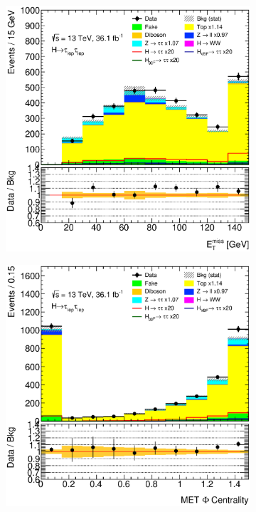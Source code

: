 \begin{figure}[htb]
\begin{subfigure}[t]{0.3\textwidth}
    \end{subfigure}
    \begin{subfigure}[t]{0.3\textwidth}
        \includegraphics[width=\textwidth]{./plots/mva/modeling/input_vars/VBF_CR/ll-CutMVAVBFCatTopCR-MET-lin.eps}
    \end{subfigure}
    \begin{subfigure}[t]{0.3\textwidth}
        \includegraphics[width=\textwidth]{./plots/mva/modeling/input_vars/VBF_CR/ll-CutMVAVBFCatTopCR-METPhiCentrality2-lin.eps}

\end{subfigure}
\end{figure}
